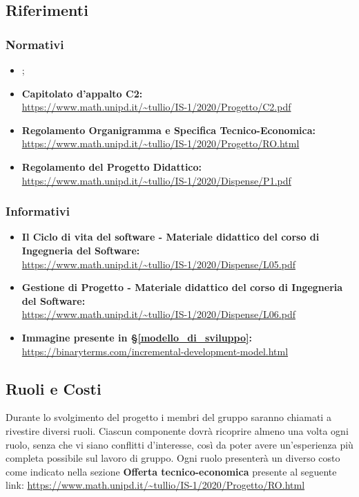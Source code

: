 \subsection{Riferimenti}
\subsubsection{Normativi}
\begin{itemize}
    \item \textit{};
    \item \textbf{Capitolato d'appalto C2:}\\
    \url{https://www.math.unipd.it/~tullio/IS-1/2020/Progetto/C2.pdf}
    \item \textbf{Regolamento Organigramma e Specifica Tecnico-Economica:}\\
    \url{https://www.math.unipd.it/~tullio/IS-1/2020/Progetto/RO.html}
    \item \textbf{Regolamento del Progetto Didattico:}\\
    \url{https://www.math.unipd.it/~tullio/IS-1/2020/Dispense/P1.pdf}
\end{itemize}

\subsubsection{Informativi}
\begin{itemize}
    \item \textbf{Il Ciclo di vita del software - Materiale didattico del corso di Ingegneria del Software:}\\
    \url{https://www.math.unipd.it/~tullio/IS-1/2020/Dispense/L05.pdf}
    \item \textbf{Gestione di Progetto - Materiale didattico del corso di Ingegneria del Software:}\\
    \url{https://www.math.unipd.it/~tullio/IS-1/2020/Dispense/L06.pdf}
    \item \textbf{Immagine presente in \S\ref{modello_di_sviluppo}:}\\
    \url{https://binaryterms.com/incremental-development-model.html}
\end{itemize}

\subsection{Ruoli e Costi}
Durante lo svolgimento del progetto i membri del gruppo {\Gruppo} saranno chiamati a rivestire diversi ruoli. Ciascun componente dovrà ricoprire almeno una volta ogni ruolo, senza che vi siano conflitti d'interesse, così da poter avere un'esperienza più completa possibile sul lavoro di gruppo. Ogni ruolo presenterà un diverso costo come indicato nella sezione \textbf{Offerta tecnico-economica} presente al seguente link: \url{https://www.math.unipd.it/~tullio/IS-1/2020/Progetto/RO.html}


